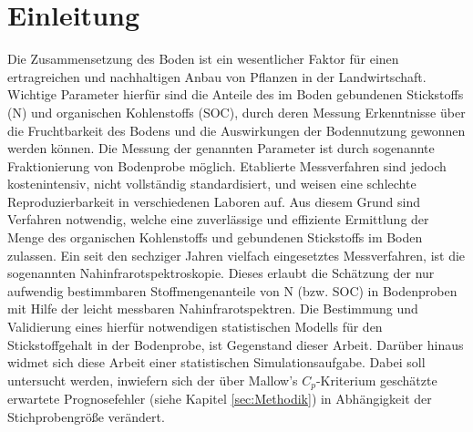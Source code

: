 \section{Einleitung}
\label{sec:Einleitung}
    Die Zusammensetzung des Boden ist ein wesentlicher Faktor für einen ertragreichen und nachhaltigen Anbau von Pflanzen in der Landwirtschaft.
    Wichtige Parameter hierfür sind die Anteile des im Boden gebundenen Stickstoffs (N) und organischen Kohlenstoffs (SOC), durch deren Messung Erkenntnisse über die Fruchtbarkeit des Bodens und die Auswirkungen der Bodennutzung gewonnen werden können.\cite{Poeplau2013}
    Die Messung der genannten Parameter ist durch sogenannte Fraktionierung von Bodenprobe möglich.
    Etablierte Messverfahren sind jedoch kostenintensiv, nicht vollständig standardisiert, und weisen eine schlechte Reproduzierbarkeit in verschiedenen Laboren auf.\cite{Poeplau2013}
    Aus diesem Grund sind Verfahren notwendig, welche eine zuverlässige und effiziente Ermittlung der Menge des organischen Kohlenstoffs und gebundenen Stickstoffs im Boden zulassen.
    Ein seit den sechziger Jahren vielfach eingesetztes Messverfahren, ist die sogenannten Nahinfrarotspektroskopie.\cite{Agelet2010}
    Dieses erlaubt die Schätzung der nur aufwendig bestimmbaren Stoffmengenanteile von N (bzw. SOC) in Bodenproben mit Hilfe der leicht messbaren Nahinfrarotspektren.
    Die Bestimmung und Validierung eines hierfür notwendigen statistischen Modells für den Stickstoffgehalt in der Bodenprobe, ist Gegenstand dieser Arbeit.
    Darüber hinaus widmet sich diese Arbeit einer statistischen Simulationsaufgabe.
    Dabei soll untersucht werden, inwiefern sich der über Mallow's $C_p$-Kriterium geschätzte erwartete Prognosefehler (siehe Kapitel \ref{sec:Methodik}) in Abhängigkeit der Stichprobengröße verändert.

